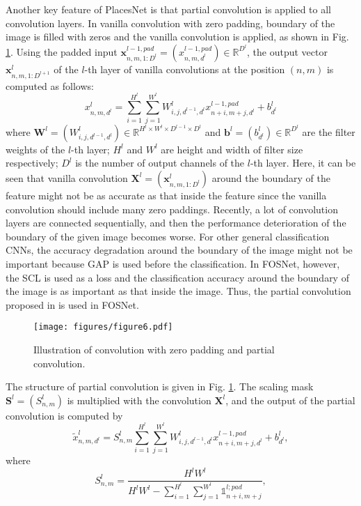 \documentclass[journal,comsoc]{IEEEtran}
\begin{document}
Another key feature of PlacesNet is that partial convolution \cite{b24} is applied to all convolution layers. In vanilla convolution with zero padding, boundary of the image is filled with zeros and the vanilla convolution is applied, as shown in Fig. \ref{fig6}. Using the padded input ${\bm{x}}_{n,m,1:{D^l}}^{l - 1,pad} = \left( {x_{n,m,{d^l}}^{l - 1,pad}} \right) \in {\mathbb{R}^{{D^l}}}$, the output vector ${\bm{x}}_{n,m,1:{D^{l + 1}}}^l$ of the $l$-th layer of vanilla convolutions at the position $\left( {n,m} \right)$ is computed as follows: 
\begin{equation}
x_{n,m,{d^l}}^l = \sum\limits_{i = 1}^{{H^l}} {\sum\limits_{j = 1}^{{W^l}} {W_{i,j,{d^{l - 1}},{d^l}}^lx_{n + i,m + j,{d^l}}^{l - 1,pad}} }  + b_{{d^l}}^l
\label{eq8}
\end{equation}
where ${{\bm{W}}^l} = \left( {W_{i,j,{d^{l - 1}},{d^l}}^l} \right) \in {\mathbb{R}^{{H^l}\times{W^l}\times{D^{l - 1}}\times{D^l}}}$ and ${{\bm{b}}^l} = \left( {b_{{d^l}}^l} \right) \in {\mathbb{R}^{{D^l}}}$ are the filter weights of the $l$-th layer; ${H^l}$ and ${W^l}$ are height and width of filter size respectively; ${D^l}$ is the number of output channels of the $l$-th layer. Here, it can be seen that vanilla convolution ${{\bm{X}}^l} = \left( {{\bm{x}}_{n,m,1:{D^l}}^l} \right)$ around the boundary of the feature might not be as accurate as that inside the feature since the vanilla convolution should include many zero paddings. Recently, a lot of convolution layers are connected sequentially, and then the performance deterioration of the boundary of the given image becomes worse. For other general classification CNNs, the accuracy degradation around the boundary of the image might not be important because GAP is used before the classification. In FOSNet, however, the SCL is used as a loss and the classification accuracy around the boundary of the image is as important as that inside the image. Thus, the partial convolution proposed in \cite{b24} is used in FOSNet.


\begin{figure}[!t]
\centering
\texttt{[image: figures/figure6.pdf]}
\caption{Illustration of convolution with zero padding and partial convolution.}
\label{fig6}
\end{figure}

The structure of partial convolution \cite{b24} is given in Fig. \ref{fig6}. The scaling mask ${{\bm{S}}^l} = \left( {S_{n,m}^l} \right)$ is multiplied with the convolution ${{\bm{X}}^l}$, and the output of the partial convolution is computed by 
\begin{equation}
\widetilde x_{n,m,{d^l}}^l = S_{n,m}^l\sum\limits_{i = 1}^{{H^l}} {\sum\limits_{j = 1}^{{W^l}} {W_{i,j,{d^{l - 1}},{d^l}}^lx_{n + i,m + j,{d^l}}^{l - 1,pad}} }  + b_{{d^l}}^l
\label{eq9}
,
\end{equation}
where
\begin{equation}
S_{n,m}^l = \frac{{{H^l}{W^l}}}{{{H^l}{W^l} - \sum\limits_{i = 1}^{{H^l}} {\sum\limits_{j = 1}^{{W^l}} {{\mathds{1}}_{n + i,m + j}^{l;pad}} } }}
\label{eq10}
,
\end{equation}
\end{document}
